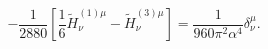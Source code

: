 \begin{equation}
-\frac{1}{2880}[\frac{1}{6} \tilde H^{(1)\mu}_{\nu}-\tilde
H^{(3)\mu}_{\nu}]
=\frac{1}{960\pi^{2}\alpha^{4}}\delta^{\mu}_{\nu}.
\end{equation}

